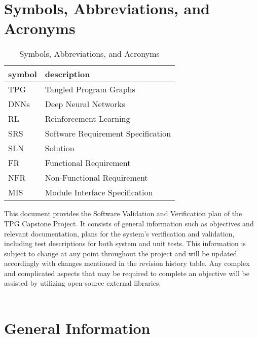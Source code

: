 \documentclass[12pt, titlepage]{article}
\begin{document}

\newpage

\section{Symbols, Abbreviations, and Acronyms}

\renewcommand{\arraystretch}{1.2}
\begin{table}[h]
  \begin{tabular}{l l} 
    \toprule		
    \textbf{symbol} & \textbf{description}\\
    \midrule 
    TPG & Tangled Program Graphs\\
    DNNs & Deep Neural Networks\\
    RL & Reinforcement Learning\\
    SRS & Software Requirement Specification\\
    SLN & Solution\\
    FR & Functional Requirement\\
    NFR & Non-Functional Requirement\\
    MIS & Module Interface Specification\\
    \bottomrule
  \end{tabular}
  \caption{Symbols, Abbreviations, and Acronyms}
  \label{symbols}
\end{table}




\newpage


This document provides the Software Validation and Verification plan of the TPG Capstone Project. It consists of general information such as objectives and relevant documentation, plans for the system's verification and validation, including test descriptions for both system and unit tests. This information is subject to change at any point throughout the project and will be updated accordingly with changes mentioned in the revision history table.
Any complex and complicated aspects that may be required to complete an objective will be assisted by utilizing open-source external libraries.\\\\

\section{General Information}
\end{document}
